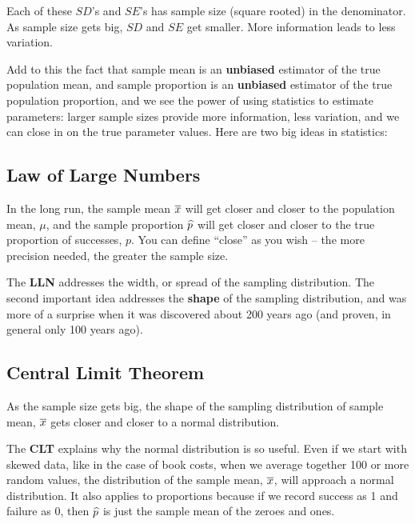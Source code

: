  Each of these $SD$'s and $SE$'s has sample size (square
  rooted) in the denominator.  As sample size gets big, $SD$ and $SE$ get
  smaller. More information leads to less variation.

  Add to this the fact that sample mean is an {\bf unbiased} estimator
  of the true population mean, and sample proportion is an {\bf
  unbiased} estimator of the true population proportion, and we see
  the power of using statistics to estimate parameters: larger sample
  sizes provide more information, less variation, and we can close in
  on the true parameter values. Here are two big ideas in statistics:

\subsection{  Law of Large Numbers}

\begin{center}
 \begin{fmpage}{.9\linewidth}
  In the long run, the sample mean $\overline{x}$ will get closer and closer to the
   population mean, $\mu$, and the sample proportion $\widehat{p}$ will get
   closer and closer to the true proportion of successes, $p$.  You can define
   ``close'' as you wish -- the more precision needed, the greater the
   sample size.
 \end{fmpage}
\end{center}

  The {\bf LLN} addresses the width, or spread of the sampling
  distribution. The second important idea addresses the {\bf shape} of
  the sampling distribution, and was more of a surprise when it was
  discovered about 200 years ago (and proven, in general only 100
  years ago).


\subsection{  Central Limit Theorem} 

\begin{center}
\begin{fmpage}{.9\linewidth}
  As the sample size gets big, the shape
  of the sampling distribution of sample mean, $\overline{x}$ gets closer and
  closer to a normal distribution.
\end{fmpage}
  \end{center}

The {\bf CLT} explains why the normal distribution is so useful.  Even if we
start with skewed data, like in the case of book costs, when we
average together 100 or more random values, the distribution of the
sample mean, $\overline{x}$,  will approach a normal distribution.  It also
applies to proportions because if we record success as 1 and failure as
0, then $\widehat{p}$ is just the sample mean of the zeroes and ones.



